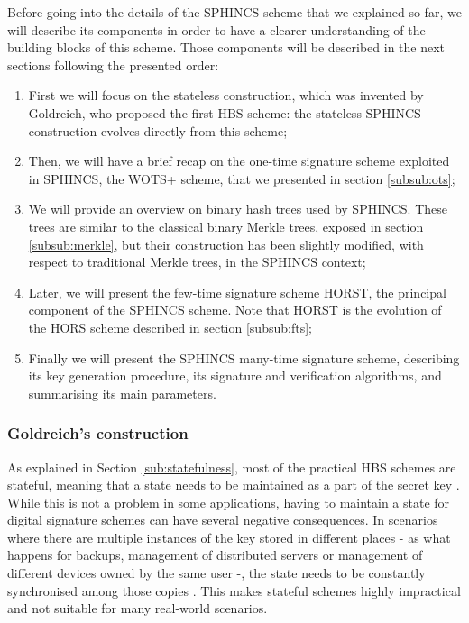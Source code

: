 \documentclass[a4paper,12pt]{article}
\begin{document}
Before going into the details of the SPHINCS scheme that we explained so far, we will describe its components in order to have a clearer understanding of the building blocks of this scheme. Those components will be described in the next sections following the presented order:
\begin{enumerate}
	\item First we will focus on the stateless construction, which was invented by Goldreich, who proposed the first HBS scheme: the stateless SPHINCS construction evolves directly from this scheme;
	\item Then, we will have a brief recap on the one-time signature scheme exploited in SPHINCS, the WOTS+ scheme, that we presented in section \ref{subsub:ots};
	\item We will provide an overview on binary hash trees used by SPHINCS. These trees are similar to the classical binary Merkle trees, exposed in section \ref{subsub:merkle}, but their construction has been slightly modified, with respect to traditional Merkle trees, in the SPHINCS context;
	\item Later, we will present the few-time signature scheme HORST, the principal component of the SPHINCS scheme. Note that HORST is the evolution of the HORS scheme described in section \ref{subsub:fts};
	\item Finally we will present the SPHINCS many-time signature scheme, describing its key generation procedure, its signature and verification algorithms, and summarising its main parameters.
\end{enumerate}


\subsubsection{Goldreich's construction}
\label{subsub:stateless}

As explained in Section \ref{sub:statefulness}, most of the practical HBS schemes are stateful, meaning that a state needs to be maintained as a part of the secret key \cite{12_faultinjection}.
While this is not a problem in some applications, having to maintain a state for digital signature schemes can have several negative consequences. In scenarios where there are multiple instances of the key stored in different places - as what happens for backups, management of distributed servers or management of different devices owned by the same user -, the state needs to be constantly synchronised among those copies \cite{8_ARM}. This makes stateful schemes highly impractical and not suitable for many real-world scenarios.
\end{document}
